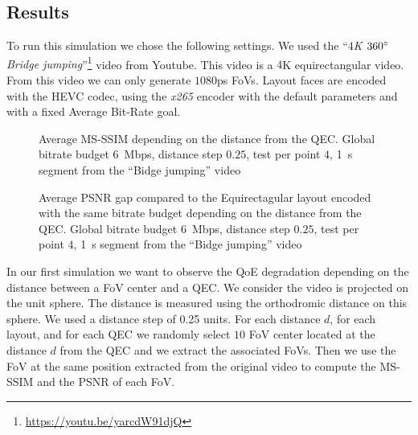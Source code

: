

\subsection{Results}
\label{subsec:results}

To run this simulation we chose the following settings. We used the
``\textit{$4$K $360^\circ{}$ Bridge
jumping}''\footnote{\url{https://youtu.be/yarcdW91djQ}} video from
Youtube. This video is a $4$K equirectangular video. From this video
we can only generate $1080$\acp{p} \acp{FoV}. Layout faces are encoded
with the \ac{HEVC} codec, using the \textit{x265} encoder with the
default parameters and with a fixed Average Bit-Rate goal.

\begin{figure}
    
    \caption{Average \acs{MS-SSIM} depending on the distance from the
    \acs{QEC}. Global bitrate budget \SI{6}{\mega bps}, distance step
    $0.25$, test per point $4$, \SI{1}{\second} segment from the ``Bidge jumping'' video}
    \label{fig:dist_quality}
\end{figure}

\begin{figure}
    
    \caption{Average \acs{PSNR} gap compared to the Equirectagular layout encoded with the same bitrate budget depending on the distance from the \acs{QEC}. Global bitrate budget \SI{6}{\mega bps}, distance step $0.25$, test per point $4$, \SI{1}{\second} segment from the ``Bidge jumping'' video}
    \label{fig:dist_quality_psnr}
\end{figure}

In our first simulation we want to observe the \ac{QoE} degradation
depending on the distance between a \ac{FoV} center and a
\ac{QEC}. We consider the video is projected on the unit sphere. The
distance is measured using the orthodromic distance on this sphere. We
used a distance step of 0.25 units. For each distance $d$, for each
layout, and for each \ac{QEC} we randomly select $10$ \ac{FoV} center
located at the distance $d$ from the \ac{QEC} and we extract the
associated \acp{FoV}. Then we use the \ac{FoV} at the same position
extracted from the original video to compute the \ac{MS-SSIM} and the
\ac{PSNR} of each \ac{FoV}.

